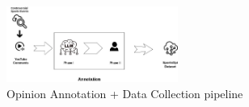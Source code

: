 \documentclass[sigconf, review]{acmart}
\begin{document}





\begin{figure}[h]
    \centering
        \centering
        \includegraphics[width=0.5\textwidth]{SportsOpi.jpg} %
        \caption{Opinion Annotation  + Data Collection pipeline}
        \label{fig:labels}
 \end{figure}




\end{document}
